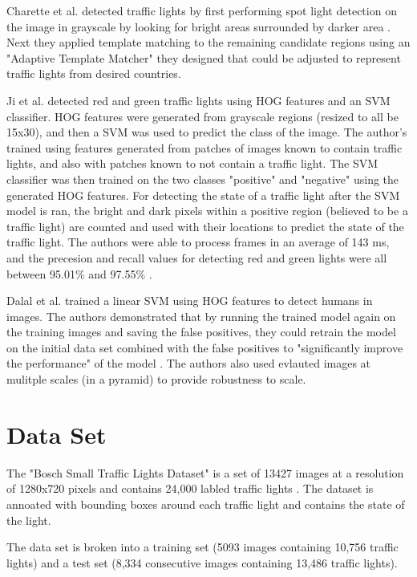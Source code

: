 \documentclass[a4paper]{article}
\begin{document}
Charette et al. detected traffic lights by first performing spot light detection on the image in grayscale by looking for bright areas surrounded by darker area \cite{charette}.  Next they applied template matching to the remaining candidate regions using an "Adaptive Template Matcher" they designed that could be adjusted to represent traffic lights from desired countries.

Ji et al. detected red and green traffic lights using HOG features and an SVM classifier.  HOG features were generated from grayscale regions (resized to all be 15x30), and then a SVM was used to predict the class of the image.  The author's trained using features generated from patches of images known to contain traffic lights, and also with  patches known to not contain a traffic light.  The SVM classifier was then trained on the two classes "positive" and "negative" using the generated HOG features.  For detecting the state of a traffic light after the SVM model is ran, the bright and dark pixels within a positive region (believed to be a traffic light) are counted and used with their locations to predict the state of the traffic light.  The authors were able to process frames in an average of 143 ms, and the precesion and recall values for detecting red and green lights were all between 95.01\% and 97.55\% \cite{ji}.

Dalal et al. trained a linear SVM using HOG features to detect humans in images.  The authors demonstrated that by running the trained model again on the training images and saving the false positives, they could retrain the model on the initial data set combined with the false positives to "significantly improve the performance" of the model \cite{dalal}.  The authors also used evlauted images at mulitple scales (in a pyramid) to provide robustness to scale.

\section{Data Set}
The "Bosch Small Traffic Lights Dataset" is a set of 13427 images at a resolution of 1280x720 pixels and contains 24,000 labled traffic lights \cite{behrendt}.  The dataset is annoated with bounding boxes around each traffic light and contains the state of the light.

The data set is broken into a training set (5093 images containing 10,756 traffic lights) and a test set (8,334 consecutive images containing 13,486 traffic lights).
\end{document}
